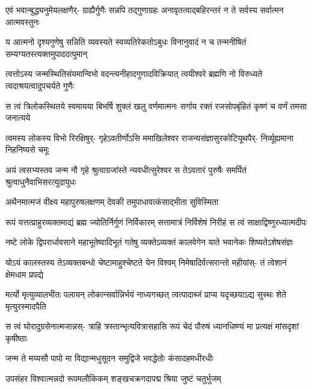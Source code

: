 \fourlineindentedshloka
{एवं भवान्बुद्ध्यनुमेयलक्षणैर्-}
{ग्राह्यैर्गुणैः सन्नपि तद्गुणाग्रहः}
{अनावृतत्वाद्बहिरन्तरं न ते}
{सर्वस्य सर्वात्मन आत्मवस्तुनः} %

\fourlineindentedshloka
{य आत्मनो दृश्यगुणेषु सन्निति}
{व्यवस्यते स्वव्यतिरेकतोऽबुधः}
{विनानुवादं न च तन्मनीषितं}
{सम्यग्यतस्त्यक्तमुपाददत्पुमान्} %

\fourlineindentedshloka
{त्वत्तोऽस्य जन्मस्थितिसंयमान्विभो}
{वदन्त्यनीहादगुणादविक्रियात्}
{त्वयीश्वरे ब्रह्मणि नो विरुध्यते}
{त्वदाश्रयत्वादुपचर्यते गुणैः} %

\fourlineindentedshloka
{स त्वं त्रिलोकस्थितये स्वमायया}
{बिभर्षि शुक्लं खलु वर्णमात्मनः}
{सर्गाय रक्तं रजसोपबृंहितं}
{कृष्णं च वर्णं तमसा जनात्यये} %

\fourlineindentedshloka
{त्वमस्य लोकस्य विभो रिरक्षिषुर्-}
{गृहेऽवतीर्णोऽसि ममाखिलेश्वर}
{राजन्यसंज्ञासुरकोटियूथपैर्-}
{निर्व्यूह्यमाना निहनिष्यसे चमूः} %

\fourlineindentedshloka
{अयं त्वसभ्यस्तव जन्म नौ गृहे}
{श्रुत्वाग्रजांस्ते न्यवधीत्सुरेश्वर}
{स तेऽवतारं पुरुषैः समर्पितं}
{श्रुत्वाधुनैवाभिसरत्युदायुधः} %



\twolineshloka
{अथैनमात्मजं वीक्ष्य महापुरुषलक्षणम्}
{देवकी तमुपाधावत्कंसाद्भीता सुविस्मिता} %



\fourlineindentedshloka
{रूपं यत्तत्प्राहुरव्यक्तमाद्यं}
{ब्रह्म ज्योतिर्निर्गुणं निर्विकारम्}
{सत्तामात्रं निर्विशेषं निरीहं}
{स त्वं साक्षाद्विष्णुरध्यात्मदीपः} %

\fourlineindentedshloka
{नष्टे लोके द्विपरार्धावसाने}
{महाभूतेष्वादिभूतं गतेषु}
{व्यक्तेऽव्यक्तं कालवेगेन याते}
{भवानेकः शिष्यतेऽशेषसंज्ञः} %

\fourlineindentedshloka
{योऽयं कालस्तस्य तेऽव्यक्तबन्धो}
{चेष्टामाहुश्चेष्टते येन विश्वम्}
{निमेषादिर्वत्सरान्तो महीयांस्-}
{तं त्वेशानं क्षेमधाम प्रपद्ये} %

\fourlineindentedshloka
{मर्त्यो मृत्युव्यालभीतः पलायन्}
{लोकान्सर्वान्निर्भयं नाध्यगच्छत्}
{त्वत्पादाब्जं प्राप्य यदृच्छयाऽद्य}
{सुस्थः शेते मृत्युरस्मादपैति} %

\fourlineindentedshloka
{स त्वं घोरादुग्रसेनात्मजान्नस्-}
{त्राहि त्रस्तान्भृत्यवित्रासहासि}
{रूपं चेदं पौरुषं ध्यानधिष्ण्यं}
{मा प्रत्यक्षं मांसदृशां कृषीष्ठाः} %

\twolineshloka
{जन्म ते मय्यसौ पापो मा विद्यान्मधुसूदन}
{समुद्विजे भवद्धेतोः कंसादहमधीरधीः} %

\twolineshloka
{उपसंहर विश्वात्मन्नदो रूपमलौकिकम्}
{शङ्खचक्रगदापद्म श्रिया जुष्टं चतुर्भुजम्} %

